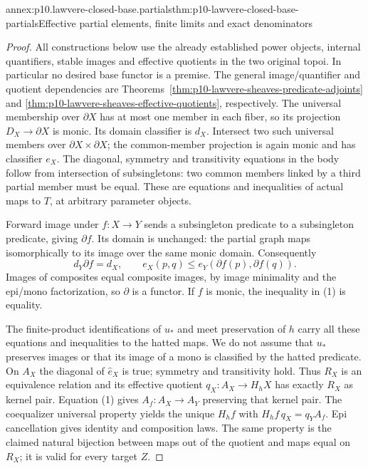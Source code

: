 \begin{annexitem}{annex:p10.lawvere-closed-base.partials}{thm:p10-lawvere-closed-base-partials}{Effective partial elements, finite limits and exact denominators}
\begin{proof}
All constructions below use the already established power objects,
internal quantifiers, stable images and effective quotients in the two
original topoi. In particular no desired base functor is a premise.
The general image/quantifier and quotient dependencies are
Theorems~\ref{thm:p10-lawvere-sheaves-predicate-adjoints} and
\ref{thm:p10-lawvere-sheaves-effective-quotients}, respectively.
The universal membership over \(\partial X\) has at most one
member in each fiber, so its projection \(D_X\to\partial X\)
is monic. Its domain classifier is \(d_X\). Intersect two such
universal members over \(\partial X\times\partial X\); the
common-member projection is again monic and has classifier \(e_X\).
The diagonal, symmetry and transitivity equations in the body follow
from intersection of subsingletons: two common members linked by a
third partial member must be equal. These are equations and inequalities
of actual maps to \(T\), at arbitrary parameter objects.

Forward image under \(f:X\to Y\) sends a subsingleton predicate
to a subsingleton predicate, giving \(\partial f\). Its domain
is unchanged: the partial graph maps isomorphically to its image over
the same monic domain. Consequently
\[
 d_Y\partial f=d_X,\qquad
 e_X(p,q)\le e_Y(\partial f(p),\partial f(q)).             \tag{1}
\]
Images of composites equal composite images, by image minimality and
the epi/mono factorization, so \(\partial\) is a functor.
If \(f\) is monic, the inequality in (1) is equality.

The finite-product identifications of \(u_*\) and meet preservation
of \(h\) carry all these equations and inequalities to the hatted
maps. We do not assume that \(u_*\) preserves images or that its
image of a mono is classified by the hatted predicate. On \(A_X\)
the diagonal of \(\widehat e_X\) is true; symmetry and transitivity
hold. Thus \(R_X\) is an equivalence relation and its effective
quotient \(q_X:A_X\to H_hX\) has exactly \(R_X\) as kernel
pair. Equation (1) gives \(A_f:A_X\to A_Y\) preserving that
kernel pair. The coequalizer universal property yields the unique
\(H_hf\) with \(H_hf\,q_X=q_YA_f\). Epi cancellation gives
identity and composition laws. The same property is the claimed
natural bijection between maps out of the quotient and maps equal
on \(R_X\); it is valid for every target \(Z\).


\end{proof}
\end{annexitem}
